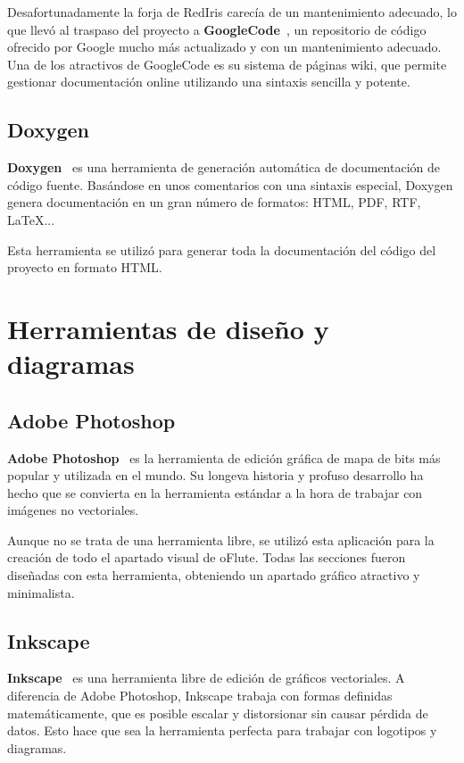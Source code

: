 Desafortunadamente la forja de RedIris carecía de un mantenimiento adecuado, lo
que llevó al traspaso del proyecto a \textbf{GoogleCode}~\cite{ofluteforja}, un
repositorio de código ofrecido por Google mucho más actualizado y con un
mantenimiento adecuado. Una de los atractivos de GoogleCode es su sistema de
páginas wiki, que permite gestionar documentación online utilizando una sintaxis
sencilla y potente.

\subsection{Doxygen}
\textbf{Doxygen}~\cite{doxygen} es una herramienta de generación automática de
documentación de código fuente. Basándose en unos comentarios con una sintaxis
especial, Doxygen genera documentación en un gran número de formatos: HTML, PDF,
RTF, \LaTeX...

Esta herramienta se utilizó para generar toda la documentación del código del
proyecto en formato HTML.


\section{Herramientas de diseño y diagramas}

\subsection{Adobe Photoshop}
\textbf{Adobe Photoshop}~\cite{photoshop} es la herramienta de edición gráfica de mapa de bits
más popular y utilizada en el mundo. Su longeva historia y profuso desarrollo ha
hecho que se convierta en la herramienta estándar a la hora de trabajar con
imágenes no vectoriales.

Aunque no se trata de una herramienta libre, se utilizó esta aplicación para la
creación de todo el apartado visual de oFlute. Todas las secciones fueron
diseñadas con esta herramienta, obteniendo un apartado gráfico atractivo y
minimalista.

\subsection{Inkscape}
\textbf{Inkscape}~\cite{inkscape} es una herramienta libre de edición de gráficos vectoriales. A
diferencia de Adobe Photoshop, Inkscape trabaja con formas definidas
matemáticamente, que es posible escalar y distorsionar sin causar pérdida de
datos. Esto hace que sea la herramienta perfecta para trabajar con logotipos y
diagramas.

